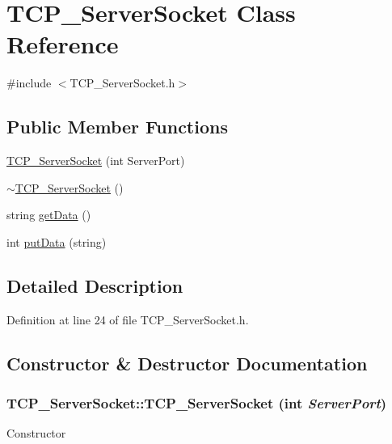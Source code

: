 \hypertarget{class_t_c_p___server_socket}{
\section{TCP\_\-ServerSocket Class Reference}
\label{class_t_c_p___server_socket}
}


{\ttfamily \#include $<$TCP\_\-ServerSocket.h$>$}

\subsection*{Public Member Functions}
\begin{DoxyCompactItemize}
\item 
\hyperlink{class_t_c_p___server_socket_a7f20fa6c05bf2dbc5ad687f4e37ee47f}{TCP\_\-ServerSocket} (int ServerPort)
\item 
\hyperlink{class_t_c_p___server_socket_ad3b63e5500c4ddc3943b89db00ab1bb2}{$\sim$TCP\_\-ServerSocket} ()
\item 
string \hyperlink{class_t_c_p___server_socket_ac36a6e5961e26d47a31dd817f7797076}{getData} ()
\item 
int \hyperlink{class_t_c_p___server_socket_a5545e5d51411a8f9ee1d69e0e22be864}{putData} (string)
\end{DoxyCompactItemize}


\subsection{Detailed Description}


Definition at line 24 of file TCP\_\-ServerSocket.h.



\subsection{Constructor \& Destructor Documentation}
\hypertarget{class_t_c_p___server_socket_a7f20fa6c05bf2dbc5ad687f4e37ee47f}{
\subsubsection[{TCP\_\-ServerSocket}]{\setlength{\rightskip}{0pt plus 5cm}TCP\_\-ServerSocket::TCP\_\-ServerSocket (int {\em ServerPort})}}
\label{class_t_c_p___server_socket_a7f20fa6c05bf2dbc5ad687f4e37ee47f}
Constructor 

